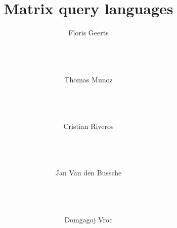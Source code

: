 \documentclass{sig-alternate}
\title{Matrix query languages}
\author{
\alignauthor Floris Geerts\\
 \affaddr{Institute for Clarity in Documentation}\\
 \affaddr{1932 Wallamaloo Lane}\\
 \affaddr{Wallamaloo, New Zealand}\\
 \email{trovato@corporation.com}\and
\alignauthor Thomas Munoz
\\ \affaddr{The Th{\o}rv\"{a}ld Group}\\
 \affaddr{1 Th{\o}rv\"{a}ld Circle}\\
 \affaddr{Hekla, Iceland}\\
 \email{larst@affiliation.org}\and
 \alignauthor Cristian Riveros
 \\ \affaddr{The Th{\o}rv\"{a}ld Group}\\
  \affaddr{1 Th{\o}rv\"{a}ld Circle}\\
  \affaddr{Hekla, Iceland}\\
  \email{larst@affiliation.org}\and
   \alignauthor Jan Van den Bussche
 \\ \affaddr{The Th{\o}rv\"{a}ld Group}\\
  \affaddr{1 Th{\o}rv\"{a}ld Circle}\\
  \affaddr{Hekla, Iceland}\\
  \email{larst@affiliation.org}\and
 \alignauthor Domgagoj Vroc
 \\ \affaddr{The Th{\o}rv\"{a}ld Group}\\
  \affaddr{1 Th{\o}rv\"{a}ld Circle}\\
  \affaddr{Hekla, Iceland}\\
  \email{larst@affiliation.org}

}
\begin{document}
\maketitle
\begin{abstract}
	
\end{abstract}
	
\end{document}
